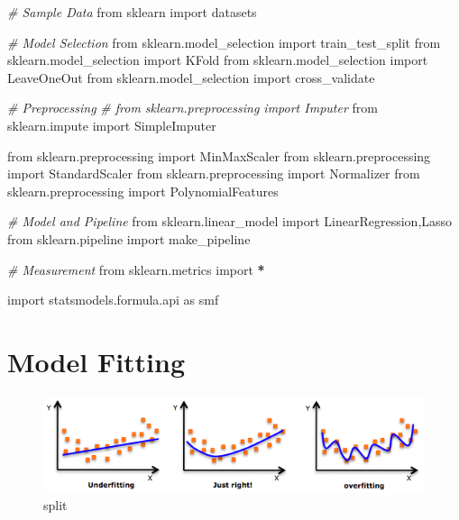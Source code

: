 \documentclass[
]{book}
\newenvironment{Shaded}{\begin{snugshade}}{\end{snugshade}}
\newcommand{\CommentTok}[1]{\textcolor[rgb]{0.37,0.37,0.37}{\textit{#1}}}
\newcommand{\ImportTok}[1]{#1}
\newcommand{\NormalTok}[1]{#1}
\newcommand{\OperatorTok}[1]{\textcolor[rgb]{0.43,0.43,0.43}{\textbf{#1}}}
\begin{document}
\begin{Shaded}
\begin{Highlighting}[]
\CommentTok{# Sample Data}
\ImportTok{from}\NormalTok{ sklearn                 }\ImportTok{import}\NormalTok{ datasets}

\CommentTok{# Model Selection}
\ImportTok{from}\NormalTok{ sklearn.model_selection }\ImportTok{import}\NormalTok{ train_test_split}
\ImportTok{from}\NormalTok{ sklearn.model_selection }\ImportTok{import}\NormalTok{ KFold}
\ImportTok{from}\NormalTok{ sklearn.model_selection }\ImportTok{import}\NormalTok{ LeaveOneOut}
\ImportTok{from}\NormalTok{ sklearn.model_selection }\ImportTok{import}\NormalTok{ cross_validate}

\CommentTok{# Preprocessing}
\CommentTok{# from sklearn.preprocessing   import Imputer}
\ImportTok{from}\NormalTok{ sklearn.impute }\ImportTok{import}\NormalTok{ SimpleImputer}

\ImportTok{from}\NormalTok{ sklearn.preprocessing   }\ImportTok{import}\NormalTok{ MinMaxScaler}
\ImportTok{from}\NormalTok{ sklearn.preprocessing   }\ImportTok{import}\NormalTok{ StandardScaler}
\ImportTok{from}\NormalTok{ sklearn.preprocessing   }\ImportTok{import}\NormalTok{ Normalizer}
\ImportTok{from}\NormalTok{ sklearn.preprocessing   }\ImportTok{import}\NormalTok{ PolynomialFeatures}

\CommentTok{# Model and Pipeline}
\ImportTok{from}\NormalTok{ sklearn.linear_model    }\ImportTok{import}\NormalTok{ LinearRegression,Lasso}
\ImportTok{from}\NormalTok{ sklearn.pipeline        }\ImportTok{import}\NormalTok{ make_pipeline}

\CommentTok{# Measurement}
\ImportTok{from}\NormalTok{ sklearn.metrics         }\ImportTok{import} \OperatorTok{*}

\ImportTok{import}\NormalTok{ statsmodels.formula.api }\ImportTok{as}\NormalTok{ smf}
\end{Highlighting}
\end{Shaded}

\hypertarget{model-fitting}{%
\section{Model Fitting}\label{model-fitting}}

\begin{figure}
\centering
\includegraphics{img/fitting.png}
\caption{split}
\end{figure}
\end{document}
